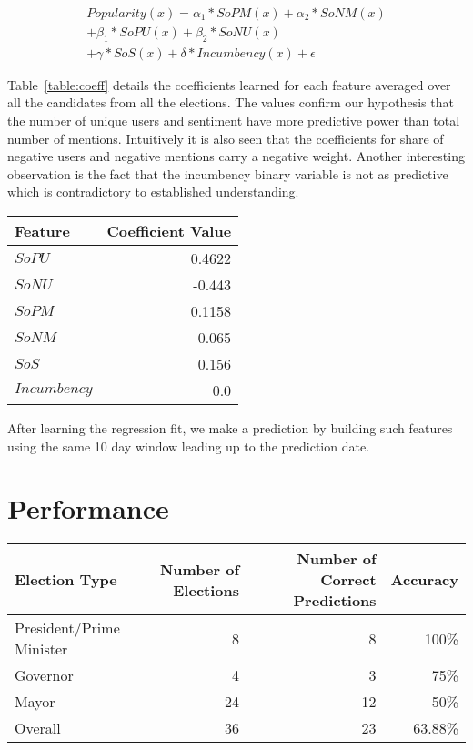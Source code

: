 \begin{equation}
\begin{split}
Popularity(x) = \alpha_1 * SoPM(x) + \alpha_2 * SoNM(x) \\
						 + \beta_1 * SoPU(x) + \beta_2 * SoNU(x) \\
						 + \gamma * SoS(x) + \delta * Incumbency(x) + \epsilon
\end{split}
\end{equation}

Table~\ref{table:coeff} details the coefficients learned for each feature averaged over all the candidates from all the elections.
The values confirm our hypothesis that the number of unique users and sentiment have more predictive power than total number of mentions.
Intuitively it is also seen that the coefficients for share of negative users and negative mentions carry a negative weight.
Another interesting observation is the fact that the incumbency binary variable is not as predictive which is 
contradictory to established understanding.

\begin{table*}
        \centering
        \begin{tabular}{|l|r|}
        \hline
        Feature & Coefficient Value\\
        \hline
        $SoPU$ & 0.4622\\
        $SoNU$ & -0.443\\
        $SoPM$ & 0.1158\\
        $SoNM$ & -0.065\\
        $SoS$ & 0.156\\
        $Incumbency$ & 0.0\\
        \hline
        \end{tabular}
        \caption{Regression coefficients learned for features}
        \label{table:coeff}
\end{table*}

After learning the regression fit, we make a prediction by building such features using the same 10 day window leading up to the prediction date.

\section{Performance}
\begin{table*}
        \centering
        \begin{tabular}{| l | r | r | r |}
        \hline
        Election Type & Number of Elections & Number of Correct Predictions & Accuracy\\
        \hline
        President/Prime Minister & 8 & 8 & 100\%\\
        Governor & 4 & 3 & 75\%\\
        Mayor & 24 & 12 & 50\%\\
        Overall & 36 & 23 & 63.88\%\\
        \hline
        \end{tabular}
        \caption{Track Record of Prediction Algorithms}
        \label{table:trackRecord}
\end{table*}

